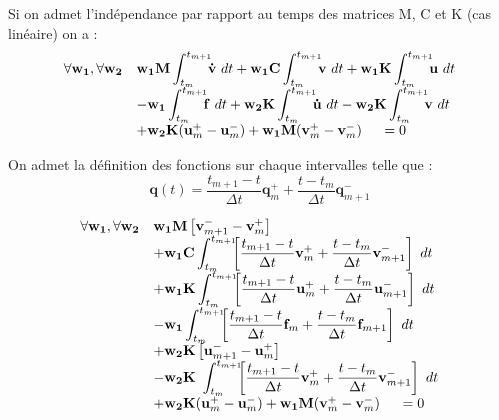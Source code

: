 \documentclass[12pt,a4paper]{report}
\begin{document}
Si on admet l'indépendance par rapport au temps des matrices M, C et K (cas linéaire) on a :
\begin{equation}
\begin{array}{r l}
	\forall \mathbf{w_1},\forall \mathbf{w_2}
	&\displaystyle
	 \mathbf{w_1} \mathbf{M}\int_{t_m}^{t_{m+1}} \!\!\!
		\mathbf{\dot{v}} ~dt
	 +\mathbf{w_1} \mathbf{C}\int_{t_m}^{t_{m+1}} \!\!\! 	
		\mathbf{v} ~dt
	 +\mathbf{w_1} \mathbf{K}\int_{t_m}^{t_{m+1}} \!\!\! 	
		\mathbf{u} ~dt
	\\
	  &\displaystyle
	   - \mathbf{w_1} \int_{t_m}^{t_{m+1}} \!\!\!
		 	\mathbf{f} ~dt	
	   + \mathbf{w_2} \mathbf{K}\int_{t_m}^{t_{m+1}} \!\!\!
	    	\mathbf{\dot{u}}~dt 
	    -\mathbf{w_2} \mathbf{K}\int_{t_m}^{t_{m+1}} \!\!\! 
	    	     \mathbf{v} ~dt
	\\
	  &+ \mathbf{w_2} \mathbf{K} (\mathbf{u}_m^+ - \mathbf{u}_m^-)
	   +  \mathbf{w_1} \mathbf{M}(\mathbf{v}_m^+ - \mathbf{v}_m^-)
	~~~~=0
\end{array}
\end{equation}

On admet la définition des fonctions sur chaque intervalles telle que :
\begin{equation}
\mathbf{q}(t) = 
			\frac{t_{m+1}-t}{\Delta t} \mathbf{q}_m^+ + 
			\frac{t-t_m}{\Delta t} \mathbf{q}_{m+1}^-
\end{equation}


\begin{equation}
\begin{array}{r l}
	\forall \mathbf{w_1},\forall \mathbf{w_2}
	&\displaystyle
	 \mathbf{w_1} \mathbf{M}
		\left[ \mathbf{v}_{m+1}^- - \mathbf{v}_m^+ \right]
	\\ 
	  &\displaystyle
	  +\mathbf{w_1} \mathbf{C}\int_{t_m}^{t_{m+1}} \!\!\! 	
		\left[
			\frac{t_{m+1}-t}{\Delta t} \mathbf{v}_m^+ + 
			\frac{t-t_m}{\Delta t} \mathbf{v}_{m+1}^- 
			\right] ~dt
	\\
	  &\displaystyle
	 +\mathbf{w_1} \mathbf{K}\int_{t_m}^{t_{m+1}} \!\!\! 	
		\left[
			\frac{t_{m+1}-t}{\Delta t} \mathbf{u}_m^+ + 
			\frac{t-t_m}{\Delta t} \mathbf{u}_{m+1}^- 
			\right] ~dt
	\\
	  &\displaystyle
	   -\mathbf{w_1} \int_{t_m}^{t_{m+1}} \!\!\!
		\left[
			\frac{t_{m+1}-t}{\Delta t} \mathbf{f}_m + 
			\frac{t-t_m}{\Delta t} \mathbf{f}_{m+1}
			\right] ~dt
	\\
	  &+\displaystyle
	    \mathbf{w_2} \mathbf{K}
		\left[ \mathbf{u}_{m+1}^- - \mathbf{u}_m^+ \right]
	\\
	  &\displaystyle	    
	    -\mathbf{w_2} \mathbf{K}~\int_{t_m}^{t_{m+1}} \!\!\! 	
		\left[
			\frac{t_{m+1}-t}{\Delta t} \mathbf{v}_m^+ + 
			\frac{t-t_m}{\Delta t} \mathbf{v}_{m+1}^- 
			\right] ~dt
	\\
	  &+ \mathbf{w_2} \mathbf{K} (\mathbf{u}_m^+ - \mathbf{u}_m^-)
	   +  \mathbf{w_1} \mathbf{M}(\mathbf{v}_m^+ - \mathbf{v}_m^-)
	~~~~=0
\end{array}
\end{equation}
\end{document}
